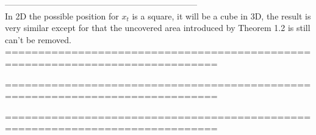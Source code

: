 \documentclass[12pt]{article}
\begin{document}
  --------------------------------------------------------------------\\  
  
  In 2D the possible position for $x_{t}$ is a square, it will be a cube in 3D, the result is very similar except for that the uncovered area introduced by Theorem 1.2 is still can't be removed.\\

  
==============================================================================

==============================================================================  

==============================================================================\\
  
      
\end{document}
